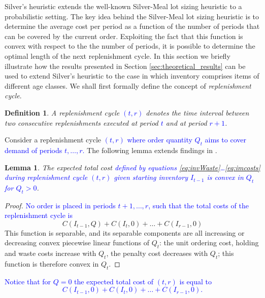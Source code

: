 \documentclass{tPRS2e}
\newcommand{\blue}{\textcolor{blue}}
\newtheorem{lem}{Lemma}
\newtheorem{mydef}{Definition}
\begin{document}
Silver's heuristic \cite{citeulike:7292564} extends the well-known Silver-Meal lot sizing heuristic \cite{SilverMeal1973} to a probabilistic setting. The key idea behind the Silver-Meal lot sizing heuristic is to determine the average cost per period as a function of the number of periods that can be covered by the current order. Exploiting the fact that this function is convex with respect to the the number of periods, it is possible to determine the optimal length of the next replenishment cycle. In this section we briefly illustrate how the results presented in Section \ref{sec:theoretical_results} can be used to extend Silver's heuristic to the case in which inventory comprises items of different age classes.
We shall first formally define the concept of {\em replenishment cycle}.
	\begin{mydef}
		A replenishment cycle \blue{$(t,r)$} denotes the time interval between two consecutive replenishments executed at period \blue{$t$} and at period \blue{$r+1$}.
	\end{mydef}
	
	Consider a replenishment cycle \blue{$(t,r)$ where order quantity $Q_t$ aims to cover demand  of periods $t,\ldots,r$.} %
	The following lemma extends findings in \cite{Federgruen}.
	\begin{lem}\label{lem:convexity}
		The expected total cost \blue{defined by equations \eqref{eq:invWaste}\ldots \eqref{eq:imcosts} during replenishment cycle $(t,r)$ given starting inventory $I_{t-1}$ is convex in $Q_t$ for $Q_t>0$}.
	\end{lem}
	\begin{proof}
		\blue{No order is placed in periods $t+1,\ldots,r$, such that the total costs of the replenishment cycle is}
		\[C({I}_{t-1},Q)+C(I_t,0)+\ldots+C({I}_{r-1},0)\]
		This function is separable, and its separable components are all increasing or decreasing convex piecewise linear functions of $Q_t$: the unit ordering cost, holding and waste costs increase with $Q_t$, the penalty cost decreases with $Q_t$; this function is therefore convex in $Q_t$.%
	\end{proof}
	\noindent
\blue{Notice that for $Q=0$ the expected total cost of $(t,r)$ is equal to
	\[C({I}_{t-1},0)+C(I_t,0)+\ldots+C({I}_{r-1},0) .\]}
	
\end{document}
